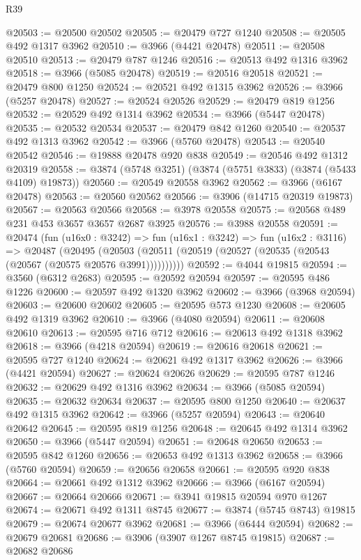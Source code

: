 \begin{lexlean}{R39}
\begin{coremodule}
@20503 := @20500 @20502
@20505 := @20479 @727 @1240
@20508 := @20505 @492 @1317 @3962
@20510 := @3966 (@4421 @20478)
@20511 := @20508 @20510
@20513 := @20479 @787 @1246
@20516 := @20513 @492 @1316 @3962
@20518 := @3966 (@5085 @20478)
@20519 := @20516 @20518
@20521 := @20479 @800 @1250
@20524 := @20521 @492 @1315 @3962
@20526 := @3966 (@5257 @20478)
@20527 := @20524 @20526
@20529 := @20479 @819 @1256
@20532 := @20529 @492 @1314 @3962
@20534 := @3966 (@5447 @20478)
@20535 := @20532 @20534
@20537 := @20479 @842 @1260
@20540 := @20537 @492 @1313 @3962
@20542 := @3966 (@5760 @20478)
@20543 := @20540 @20542
@20546 := @19888 @20478 @920 @838
@20549 := @20546 @492 @1312 @20319
@20558 := @3874 (@5748 @3251) (@3874 (@5751 @3833) (@3874 (@5433 @4109) @19873))
@20560 := @20549 @20558 @3962
@20562 := @3966 (@6167 @20478)
@20563 := @20560 @20562
@20566 := @3906 (@14715 @20319 @19873)
@20567 := @20563 @20566
@20568 := @3978 @20558
@20575 := @20568 @489 @231 @453 @3657 @3657 @2687 @3925
@20576 := @3988 @20558
@20591 := @20474
    (fun (u16x0 : @3242) =>
    fun (u16x1 : @3242) =>
    fun (u16x2 : @3116) =>
    @20487
      (@20495 (@20503 (@20511 (@20519 (@20527 (@20535 (@20543 (@20567 (@20575 @20576 @3991))))))))))
@20592 := @4044 @19815
@20594 := @3560 (@6312 @2683)
@20595 := @20592 @20594
@20597 := @20595 @486 @1226
@20600 := @20597 @492 @1320 @3962
@20602 := @3966 (@3968 @20594)
@20603 := @20600 @20602
@20605 := @20595 @573 @1230
@20608 := @20605 @492 @1319 @3962
@20610 := @3966 (@4080 @20594)
@20611 := @20608 @20610
@20613 := @20595 @716 @712
@20616 := @20613 @492 @1318 @3962
@20618 := @3966 (@4218 @20594)
@20619 := @20616 @20618
@20621 := @20595 @727 @1240
@20624 := @20621 @492 @1317 @3962
@20626 := @3966 (@4421 @20594)
@20627 := @20624 @20626
@20629 := @20595 @787 @1246
@20632 := @20629 @492 @1316 @3962
@20634 := @3966 (@5085 @20594)
@20635 := @20632 @20634
@20637 := @20595 @800 @1250
@20640 := @20637 @492 @1315 @3962
@20642 := @3966 (@5257 @20594)
@20643 := @20640 @20642
@20645 := @20595 @819 @1256
@20648 := @20645 @492 @1314 @3962
@20650 := @3966 (@5447 @20594)
@20651 := @20648 @20650
@20653 := @20595 @842 @1260
@20656 := @20653 @492 @1313 @3962
@20658 := @3966 (@5760 @20594)
@20659 := @20656 @20658
@20661 := @20595 @920 @838
@20664 := @20661 @492 @1312 @3962
@20666 := @3966 (@6167 @20594)
@20667 := @20664 @20666
@20671 := @3941 @19815 @20594 @970 @1267
@20674 := @20671 @492 @1311 @8745
@20677 := @3874 (@5745 @8743) @19815
@20679 := @20674 @20677 @3962
@20681 := @3966 (@6444 @20594)
@20682 := @20679 @20681
@20686 := @3906 (@3907 @1267 @8745 @19815)
@20687 := @20682 @20686

\end{coremodule}
\end{lexlean}
